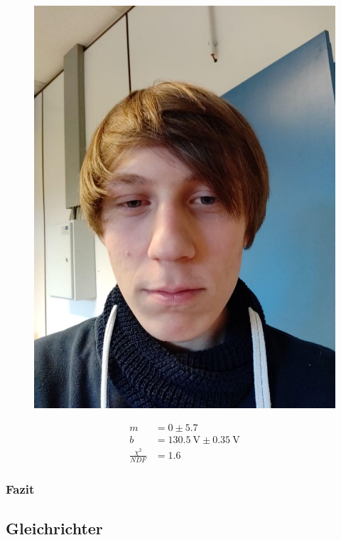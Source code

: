\documentclass[12pt,twoside,a4paper]{scrartcl}
\begin{document}
				\begin{figure}[H]
					\begin{minipage}{0.49 \textwidth}
						\includegraphics[width = 0.9 \textwidth]{Pictures/Platzhalter}
					\end{minipage}
					\begin{minipage}{0.49 \textwidth}
						\begin{align*}
							m &= 0 \pm 5.7 \\
							b &= \SI{130.5}{ \volt } \pm \SI{0.35}{\volt} \\
							\frac{\chi^2}{NDF} &= 1.6
						\end{align*}
					\end{minipage}
				\end{figure}

			\subsubsection{Fazit}

	\subsection{Gleichrichter}
\end{document}
